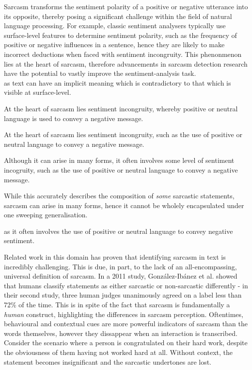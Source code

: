 \documentclass[12pt,a4paper]{article}
\begin{document}
Sarcasm transforms the sentiment polarity of a positive or negative utterance into its opposite, thereby posing a significant challenge within the field of natural language processing. For example, classic sentiment analysers typically use surface-level features to determine sentiment polarity, such as the frequency of positive or negative influences in a sentence, hence they are likely to make incorrect deductions when faced with sentiment incongruity. This phenonmenon lies at the heart of sarcasm, therefore advancements in sarcasm detection research have the potential to vastly improve the sentiment-analysis task.\\






as text can have an implicit meaning which is contradictory to that which is visible at surface-level.



At the heart of sarcasm lies sentiment incongruity, whereby positive or neutral language is used to convey a negative message.

At the heart of sarcasm lies sentiment incongruity, such as the use of positive or neutral language to convey a negative message.

Although it can arise in many forms, it often involves some level of sentiment incogruity, such as the use of positive or neutral language to convey a negative message.

While this accurately describes the composition of \textit{some} sarcastic statements, sarcasm can arise in many forms, hence it cannot be wholely encapsulated under one sweeping generalisation. 


 as it often involves the use of positive or neutral language to convey negative sentiment.



\noindent Related work in this domain has proven that identifying sarcasm in text is incredibly challenging. This is due, in part, to the lack of an all-encompassing, universal definition of sarcasm. In a 2011 study, Gonz{\'a}lez-Ib{\'a}nez et al. \cite{gonzalez2011identifying} showed that humans  classify statements as either sarcastic or non-sarcastic differently - in their second study, three human judges unanimously agreed on a label less than 72\% of the time. This is in spite of the fact that sarcasm is fundamentally a \textit{human} construct, highlighting the differences in sarcasm perception. Oftentimes, behavioural and contextual cues are more powerful indicators of sarcasm than the words themselves, however they dissappear when an interaction is transcribed. Consider the scenario where a person is congratulated on their hard work, despite the obviousness of them having not worked hard at all. Without context, the statement becomes insignificant and the sarcastic undertones are lost. \\
\end{document}

